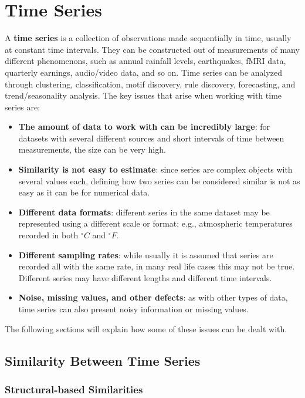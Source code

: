 \chapter{Time Series}

A \textbf{time series} is a collection of observations made sequentially in time, usually at constant time intervals. They can be constructed out of measurements of many different phenomenons, such as annual rainfall levels, earthquakes, fMRI data, quarterly earnings, audio/video data, and so on. Time series can be analyzed through clustering, classification, motif discovery, rule discovery, forecasting, and trend/seasonality analysis. The key issues that arise when working with time series are:
\begin{itemize}
    \item \textbf{The amount of data to work with can be incredibly large}: for datasets with several different sources and short intervals of time between measurements, the size can be very high.

    \item \textbf{Similarity is not easy to estimate}: since series are complex objects with several values each, defining how two series can be considered similar is not as easy as it can be for numerical data.

    \item \textbf{Different data formats}: different series in the same dataset may be represented using a different scale or format; e.g., atmospheric temperatures recorded in both $^{\circ}C$ and $^{\circ}F$.

    \item \textbf{Different sampling rates}: while usually it is assumed that series are recorded all with the same rate, in many real life cases this may not be true. Different series may have different lengths and different time intervals.

    \item \textbf{Noise, missing values, and other defects}: as with other types of data, time series can also present noisy information or missing values.
\end{itemize}
The following sections will explain how some of these issues can be dealt with.

\section{Similarity Between Time Series}

\subsection{Structural-based Similarities}

